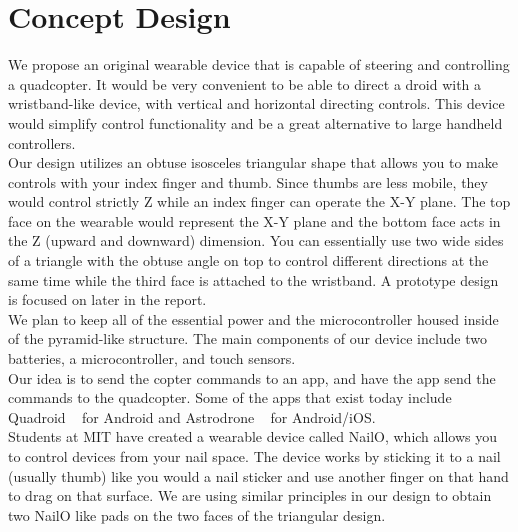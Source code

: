 \documentclass[12pt,letterpaper]{article}
\begin{document}
\section*{Concept Design}
\hspace{1cm}We propose an original wearable device that is capable of steering and controlling a quadcopter. It would be very convenient to be able to direct a droid with a wristband-like device, with vertical and horizontal directing controls. This device would simplify control functionality and be a great alternative to large handheld controllers.\\
\hspace{1cm}Our design utilizes an obtuse isosceles triangular shape that allows you to make controls with your index finger and thumb. Since thumbs are less mobile, they would control strictly Z while an index finger can operate the X-Y plane. The top face on the wearable would represent the X-Y plane and the bottom face acts in the Z (upward and downward) dimension. You can essentially use two wide sides of a triangle with the obtuse angle on top to control different directions at the same time while the third face is attached to the wristband. A prototype design is focused on later in the report.\\
\hspace{1cm}We plan to keep all of the essential power and the microcontroller housed inside of the pyramid-like structure. The main components of our device include two batteries, a microcontroller, and touch sensors.\\
\hspace{1cm}Our idea is to send the copter commands to an app, and have the app send the commands to the quadcopter. Some of the apps that exist today include Quadroid ~\cite{quadroid} for Android and Astrodrone ~\cite{astrodrone} for Android/iOS. \\
\hspace{1cm}Students at MIT have created a wearable device called NailO, which allows you to control devices from your nail space. The device works by sticking it to a nail (usually thumb) like you would a nail sticker and use another finger on that hand to drag on that surface. We are using similar principles in our design to obtain two NailO like pads on the two faces of the triangular design. \\
\end{document}

